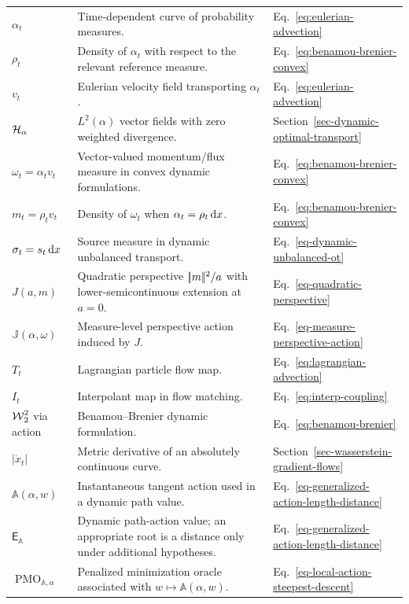 {\begin{longtable}{>{\raggedright\arraybackslash}p{}
                  >{\raggedright\arraybackslash}p{}
                  >{\raggedright\arraybackslash}p{}}
\hline
\multicolumn{3}{l}{\textbf{Dynamic OT and Wasserstein gradient flows}}\\
\hline
$\alpha_t$ & Time-dependent curve of probability measures. & Eq.~\eqref{eq:eulerian-advection} \\
$\rho_t$ & Density of $\alpha_t$ with respect to the relevant reference measure. & Eq.~\eqref{eq:benamou-brenier-convex} \\
$v_t$ & Eulerian velocity field transporting $\alpha_t$. & Eq.~\eqref{eq:eulerian-advection} \\
$\mathcal{H}_\alpha$ & $L^2(\alpha)$ vector fields with zero weighted divergence. & Section~\ref{sec-dynamic-optimal-transport} \\
$\omega_t=\alpha_t v_t$ & Vector-valued momentum/flux measure in convex dynamic formulations. & Eq.~\eqref{eq:benamou-brenier-convex} \\
$m_t=\rho_t v_t$ & Density of $\omega_t$ when $\alpha_t=\rho_t\,\mathrm{d} x$. & Eq.~\eqref{eq:benamou-brenier-convex} \\
$\sigma_t=s_t\,\mathrm{d} x$ & Source measure in dynamic unbalanced transport. & Eq.~\eqref{eq-dynamic-unbalanced-ot} \\
$J(a,m)$ & Quadratic perspective $|\!| m |\!|^2/a$ with lower-semicontinuous extension at $a=0$. & Eq.~\eqref{eq-quadratic-perspective} \\
$\mathbb J(\alpha,\omega)$ & Measure-level perspective action induced by $J$. & Eq.~\eqref{eq-measure-perspective-action} \\
$T_t$ & Lagrangian particle flow map. & Eq.~\eqref{eq:lagrangian-advection} \\
$I_t$ & Interpolant map in flow matching. & Eq.~\eqref{eq:interp-coupling} \\
$\operatorname{\mathcal{W}}_2^2$ via action & Benamou--Brenier dynamic formulation. & Eq.~\eqref{eq:benamou-brenier} \\
$|\dot x_t|$ & Metric derivative of an absolutely continuous curve. & Section~\ref{sec-wasserstein-gradient-flows} \\
$\mathbb A(\alpha,w)$ & Instantaneous tangent action used in a dynamic path value. & Eq.~\eqref{eq-generalized-action-length-distance} \\
$\mathsf E_{\mathbb A}$ & Dynamic path-action value; an appropriate root is a distance only under additional hypotheses. & Eq.~\eqref{eq-generalized-action-length-distance} \\
$\operatorname{PMO}_{\mathbb A,\alpha}$ & Penalized minimization oracle associated with \(w\mapsto\mathbb A(\alpha,w)\). & Eq.~\eqref{eq-local-action-steepest-descent} \\

\end{longtable}}
